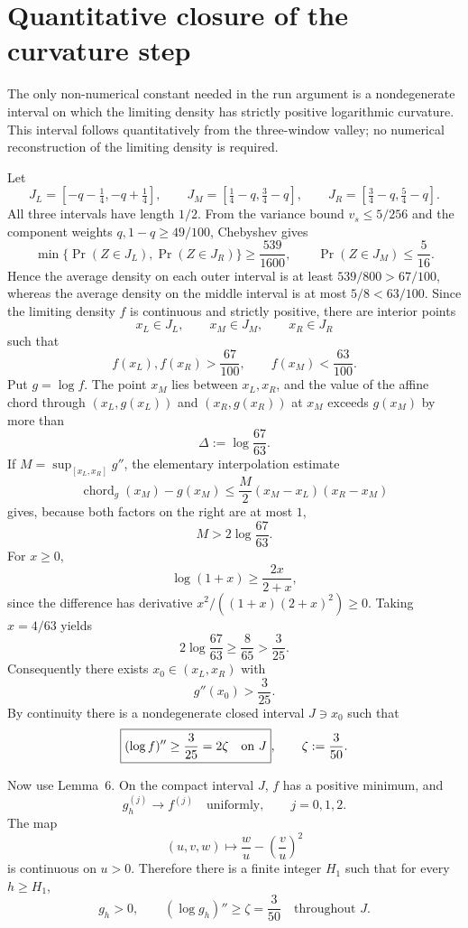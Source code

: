 \section*{Quantitative closure of the curvature step}

The only non-numerical constant needed in the run argument is a nondegenerate
interval on which the limiting density has strictly positive logarithmic
curvature.  This interval follows quantitatively from the three-window valley;
no numerical reconstruction of the limiting density is required.

Let
\[
J_L=[-q-\tfrac14,-q+\tfrac14],\qquad
J_M=[\tfrac14-q,\tfrac34-q],\qquad
J_R=[\tfrac34-q,\tfrac54-q].
\]
All three intervals have length \(1/2\).  From the variance bound
\(v_s\le 5/256\) and the component weights \(q,1-q\ge49/100\),
Chebyshev gives
\[
 \min\{\Pr(Z\in J_L),\Pr(Z\in J_R)\}\ge \frac{539}{1600},
 \qquad
 \Pr(Z\in J_M)\le\frac{5}{16}.
\]
Hence the average density on each outer interval is at least
\(539/800>67/100\), whereas the average density on the middle interval is at
most \(5/8<63/100\).  Since the limiting density \(f\) is continuous and
strictly positive, there are interior points
\[
x_L\in J_L,\qquad x_M\in J_M,\qquad x_R\in J_R
\]
such that
\[
f(x_L),f(x_R)>\frac{67}{100},
\qquad
f(x_M)<\frac{63}{100}.
\]
Put \(g=\log f\).  The point \(x_M\) lies between \(x_L,x_R\), and the value of
the affine chord through \((x_L,g(x_L))\) and \((x_R,g(x_R))\) at \(x_M\)
exceeds \(g(x_M)\) by more than
\[
\Delta:=\log\frac{67}{63}.
\]
If \(M=\sup_{[x_L,x_R]}g''\), the elementary interpolation estimate
\[
\operatorname{chord}_g(x_M)-g(x_M)
 \le \frac{M}{2}(x_M-x_L)(x_R-x_M)
\]
gives, because both factors on the right are at most \(1\),
\[
M>2\log\frac{67}{63}.
\]
For \(x\ge0\),
\[
\log(1+x)\ge\frac{2x}{2+x},
\]
since the difference has derivative
\(x^2/((1+x)(2+x)^2)\ge0\).  Taking \(x=4/63\) yields
\[
2\log\frac{67}{63}\ge\frac8{65}>\frac3{25}.
\]
Consequently there exists \(x_0\in(x_L,x_R)\) with
\[
g''(x_0)>\frac3{25}.
\]
By continuity there is a nondegenerate closed interval \(J\ni x_0\) such that
\[
\boxed{(\log f)''\ge\frac3{25}=2\zeta\quad\hbox{on }J},
\qquad
\zeta:=\frac3{50}.
\]

Now use Lemma~6.  On the compact interval \(J\), \(f\) has a positive minimum,
and
\[
g_h^{(j)}\longrightarrow f^{(j)}
\quad\text{uniformly},\qquad j=0,1,2.
\]
The map
\[
(u,v,w)\longmapsto \frac wu-\left(\frac vu\right)^2
\]
is continuous on \(u>0\).  Therefore there is a finite integer \(H_1\) such
that for every \(h\ge H_1\),
\[
g_h>0,\qquad
(\log g_h)''\ge\zeta=\frac3{50}
\quad\text{throughout }J.
\]

